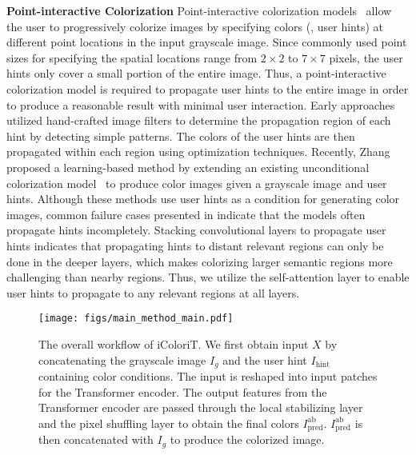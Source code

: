 \documentclass[10pt,twocolumn,letterpaper]{article}
\begin{document}
\vspace{+0.1cm}
\noindent \textbf{Point-interactive Colorization} 
Point-interactive colorization models~\cite{levin2004, zhang2017, side} allow the user to progressively colorize images by specifying colors (\ie, user hints) at different point locations in the input grayscale image.
Since commonly used point sizes for specifying the spatial locations range from $2\times 2$ to $7\times 7$ pixels, the user hints only cover a small portion of the entire image.  
Thus, a point-interactive colorization model is required to propagate user hints to the entire image in order to produce a reasonable result with minimal user interaction. 
Early approaches~\cite{levin2004, side} utilized hand-crafted image filters to determine the propagation region of each hint by detecting simple patterns. 
The colors of the user hints are then propagated within each region using optimization techniques. 
Recently, Zhang~\etal~\cite{zhang2017} proposed a learning-based method by extending an existing unconditional colorization model~\cite{cic} to produce color images given a grayscale image and user hints. 
Although these methods use user hints as a condition for generating color images, common failure cases presented in  indicate that the models often propagate hints incompletely. 
Stacking convolutional layers to propagate user hints indicates that propagating hints to distant relevant regions can only be done in the deeper layers, which makes colorizing larger semantic regions more challenging than nearby regions. 
Thus, we utilize the self-attention layer to enable user hints to propagate to any relevant regions at all layers. 

\begin{figure*}[ht]
    \centering
    \texttt{[image: figs/main\_method\_main.pdf]}
    \vspace{-0.6cm}
    \caption{The overall workflow of iColoriT. We first obtain input $X$ by concatenating the grayscale image $I_g$ and the user hint $I_{\text{hint}}$ containing color conditions. The input is reshaped into input patches for the Transformer encoder. The output features from the Transformer encoder are passed through the local stabilizing layer and the pixel shuffling layer to obtain the final colors $I_{\text{pred}}^{\text{ab}}$. $I_{\text{pred}}^{\text{ab}}$ is then concatenated with $I_g$ to produce the colorized image.}
    \label{fig:method_main}
    \vspace{-0.5cm}
\end{figure*}
\end{document}
